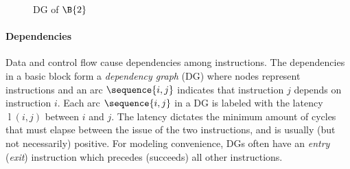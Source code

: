 \documentclass[acmsmall,authorversion,nonacm]{acmart}
\newcommand{\noMathVar}[2]{\operatorname{#1}(#2)}
\newcommand{\var}[2]{$\noMathVar{#1}{#2}$}
\begin{document}
\begin{wrapfigure}{r}{0.19\textwidth}
{{
 }}
  \vspace{-0.35cm}\caption{DG of $\B{2}$}
  \label{fig:dg}
  \vspace{-0.35cm}\end{wrapfigure}
\paragraph{Dependencies}

Data and control flow cause dependencies among instructions.
The dependencies in a basic block form a \emph{dependency graph} (DG)
where nodes represent instructions and an arc $\sequence{i,j}$
indicates that instruction $j$ depends on instruction $i$.
Each arc $\sequence{i,j}$ in a DG is labeled with the latency
\var{l}{i,j} between $i$ and $j$.
The latency dictates the minimum amount of cycles that must elapse
between the issue of the two instructions, and is usually (but not
necessarily) positive.
For modeling convenience, DGs often have an \emph{entry} (\emph{exit})
instruction which precedes (succeeds) all other instructions.
\end{document}
